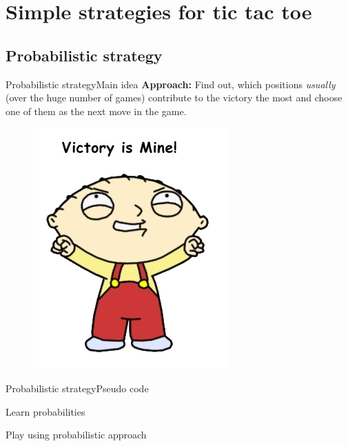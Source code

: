 \documentclass[aspectratio=169]{beamer}
\begin{document}
\section{Simple strategies for tic tac toe}

\subsection{Probabilistic strategy}

\begin{frame}{Probabilistic strategy}{Main idea}
\textbf{Approach:}
Find out, which positions \textit{usually} (over the huge number of games) contribute to the victory the most and choose one of them as the next move in the game.
\begin{figure}
	\includegraphics[scale = 0.5]{victory.jpg}	
\end{figure}
\end{frame}

\begin{frame}{Probabilistic strategy}{Pseudo code}
\begin{block}{Learn probabilities}
\Probabilistic

\end{block}
\begin{block}{Play using probabilistic approach}
\ProbabilisticPlay
\end{block}
\end{frame}
\end{document}
